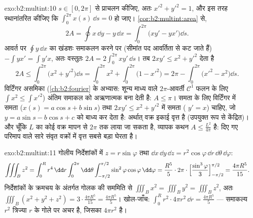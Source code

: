 \begin{solution}{exo:b2:multint:10}
 $s \in [0, 2\pi]$ से प्राचलन कीजिए, अतः $x'^2 + y'^2 = 1$, और इस तरह स्थानांतरित
कीजिए कि $\int_0^{2\pi} x(s)\,\dd s = 0$ हो जाए। \cref{cor:b2:multint:area} से,
\[
2A = \oint x\,\dd y - y\,\dd x
= \int_0^{2\pi}\bigl(xy' - yx'\bigr)\dd s .
\]
आवर्त पर $\oint y\,\dd x$ का खंडशः समाकलन करने पर (सीमांत पद आवर्तिता से कट
जाते हैं) $-\int yx' = \int y'x$, अतः वस्तुतः $2A = 2\int_0^{2\pi}xy'\,\dd s$। तब $2xy' \leq x^2 + y'^2$ देता है
\[
2A \leq \int_0^{2\pi}\bigl(x^2 + y'^2\bigr)\dd s
= \int_0^{2\pi} x^2 + \int_0^{2\pi}\bigl(1 - x'^2\bigr)
= 2\pi - \int_0^{2\pi}\bigl(x'^2 - x^2\bigr)\dd s .
\]
विर्टिंगर असमिका (\cref{ch:b2:fourier} के अभ्यास: शून्य माध्य वाले $2\pi$-आवर्ती
$\mathcal{C}^1$ फलन के लिए $\int x^2 \leq \int x'^2$) अंतिम समाकल को अऋणात्मक बना देती है:
$A \leq \pi$। समता के लिए विर्टिंगर में समता ($x(s) =
a\cos s + b\sin s$) तथा $2xy' \leq x^2 + y'^2$ में समता
( $y' = x$) चाहिए, जो $y = a\sin s - b\cos s + c$ को बाध्य कर देता है: अर्थात् वक्र
इकाई वृत्त है (उपयुक्त रूप से केंद्रित)। और चूँकि  $L$ का
कोई वक्र मापन से  $2\pi$ तक लाया जा सकता है, व्यापक कथन $A \leq
\frac{L^2}{4\pi}$
है: दिए गए परिमाप वाले सारे संवृत वक्रों में वृत्त सबसे बड़ा
 घेरता है।
\end{solution}

\begin{solution}{exo:b2:multint:11}
गोलीय निर्देशांकों में $z = r\sin\varphi$ तथा $\dd x\,\dd
y\,\dd z = r^2\cos\varphi\,\dd r\,\dd\theta\,\dd\varphi$:
\[
\iiint_B z^2
= \int_0^R r^4\,\dd r\int_0^{2\pi}\dd\theta
\int_{-\pi/2}^{\pi/2}\sin^2\varphi\cos\varphi\,\dd\varphi
= \frac{R^5}5\cdot2\pi\cdot
\Bigl[\frac{\sin^3\varphi}3\Bigr]_{-\pi/2}^{\pi/2}
= \frac{4\pi R^5}{15}.
\]
निर्देशांकों के क्रमचय के अंतर्गत गोलक की सममिति से $\iiint_B x^2 = \iiint_B y^2 = \iiint_B z^2$, अतः $\iiint_B(x^2
+ y^2 + z^2) = 3\cdot\frac{4\pi R^5}{15} = \frac{4\pi R^5}5$।
खोल-जाँच: $\int_0^R r^2\cdot 4\pi r^2\,\dd r = \frac{4\pi
R^5}5$ --- समाकल्य $r^2$ त्रिज्या $r$ के गोले पर अचर है,
जिसका  $4\pi r^2$ है।
\end{solution}

